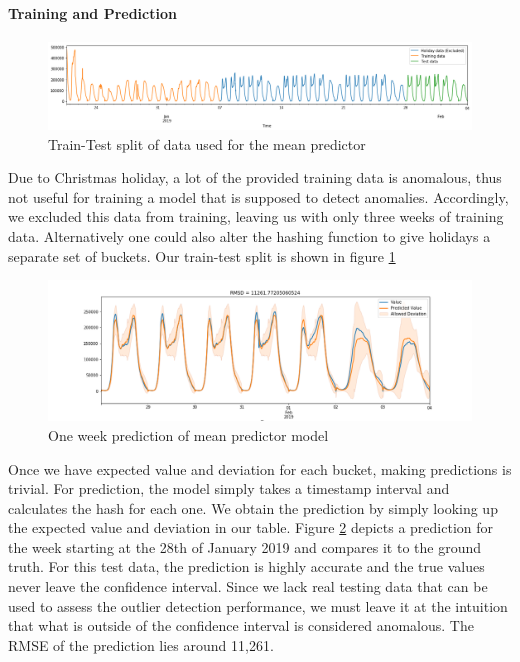 \paragraph{Training and Prediction}
\begin{figure}[h]
    \centering
    \includegraphics[width=1\textwidth]{images/mean_pred_training_data.png}
    \caption{Train-Test split of data used for the mean predictor}
    \label{fig:mean_predictor_training_data}
\end{figure}
Due to Christmas holiday, a lot of the provided training data is anomalous, thus not useful for training a model that is supposed to detect anomalies. Accordingly, we excluded this data from training, leaving us with only three weeks of training data. Alternatively one could also alter the hashing function to give holidays a separate set of buckets. Our train-test split is shown in figure \ref{fig:mean_predictor_training_data}

\begin{figure}
    \centering
    \includegraphics[width=1\textwidth]{images/mean_pred_test.png}
    \caption{One week prediction of mean predictor model}
    \label{fig:mean_predictor_prediction}
\end{figure}

Once we have expected value and deviation for each bucket, making predictions is trivial. For prediction, the model simply takes a timestamp interval and calculates the hash for each one. We obtain the prediction by simply looking up the expected value and deviation in our table. Figure \ref{fig:mean_predictor_prediction} depicts a prediction for the week starting at the 28th of January 2019 and compares it to the ground truth. For this test data, the prediction is highly accurate and the true values never leave the confidence interval. Since we lack real testing data that can be used to assess the outlier detection performance, we must leave it at the intuition that what is outside of the confidence interval is considered anomalous. The RMSE of the prediction lies around 11,261.
\pagebreak

